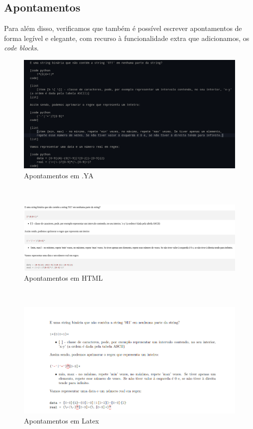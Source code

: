 \documentclass{article}
\begin{document}
 \subsection{Apontamentos}
Para além disso, verificamos que também é possível escrever apontamentos de forma legível e elegante, com recurso à funcionalidade extra que adicionamos, os \textit{code blocks}.\\
 
\begin{figure}[!ht]
\centering
\includegraphics[width=\textwidth]{images/apontamentosYA.png}
\caption{Apontamentos em .YA}
\end{figure}
\\
 
\begin{figure}[!ht]
\centering
\includegraphics[width=\textwidth]{images/apontamentosHTML.png}
\caption{Apontamentos em HTML}
\end{figure}
\\
 
\begin{figure}[!ht]
\centering
\includegraphics[width=\textwidth]{images/apontamentosTEX.png}
\caption{Apontamentos em Latex}
\end{figure}
 \clearpage
\end{document}
